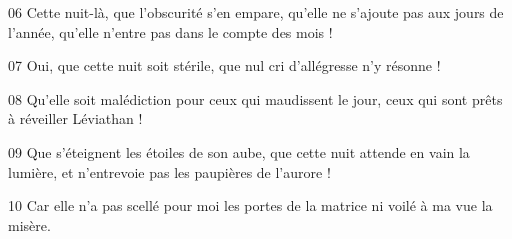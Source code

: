 
06 Cette nuit-là, que l’obscurité s’en empare, qu’elle ne s’ajoute pas aux jours de l’année, qu’elle n’entre pas dans le compte des mois !

07 Oui, que cette nuit soit stérile, que nul cri d’allégresse n’y résonne !

08 Qu’elle soit malédiction pour ceux qui maudissent le jour, ceux qui sont prêts à réveiller Léviathan !

09 Que s’éteignent les étoiles de son aube, que cette nuit attende en vain la lumière, et n’entrevoie pas les paupières de l’aurore !

10 Car elle n’a pas scellé pour moi les portes de la matrice ni voilé à ma vue la misère.
